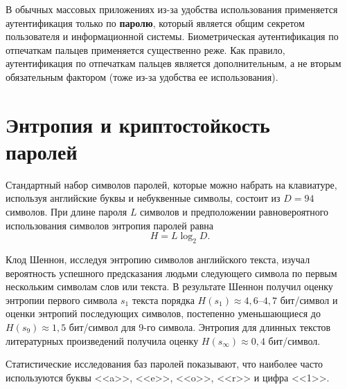 \documentclass[10pt,a4paper]{book}
\begin{document}
В обычных массовых приложениях из-за удобства использования применяется аутентификация только по \textbf{паролю}, который является общим секретом пользователя и информационной системы. Биометрическая аутентификация по отпечаткам пальцев применяется существенно реже. Как правило, аутентификация по отпечаткам пальцев является дополнительным, а не вторым обязательным фактором (тоже из-за удобства ее использования).



\section[Энтропия и криптостойкость паролей]{Энтропия и криптостойкость \protect\\ паролей}

Стандартный набор символов паролей, которые можно набрать на клавиатуре, используя английские буквы и небуквенные символы, состоит из $D=94$ символов. При длине пароля $L$ символов и предположении равновероятного использования символов энтропия паролей равна
    \[ H = L \log_2 D. \]

Клод Шеннон, исследуя энтропию символов английского текста, изучал вероятность успешного предсказания людьми следующего символа по первым нескольким символам слов или текста. В результате Шеннон получил оценку энтропии первого символа $s_1$ текста порядка $H(s_1) \approx 4{,}6$--$4{,}7$ бит/символ и оценки энтропий последующих символов, постепенно уменьшающиеся до $H(s_9) \approx 1{,}5$ бит/символ для 9-го символа. Энтропия для длинных текстов литературных произведений получила оценку $H(s_\infty) \approx 0{,}4$ бит/символ.

Статистические исследования баз паролей показывают, что наиболее часто используются буквы <<a>>, <<e>>, <<o>>, <<r>> и цифра <<1>>.
\end{document}
